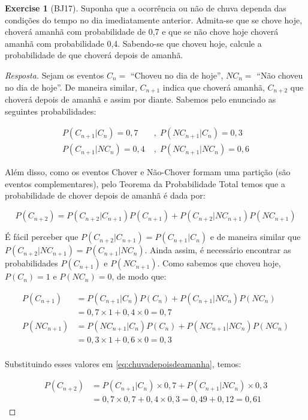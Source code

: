 \documentclass[
]{article}
\theoremstyle{definition}
\theoremstyle{definition}
\theoremstyle{definition}
\newtheorem{exercise}{Exercise}[section]
\theoremstyle{definition}
\theoremstyle{remark}
\begin{document}
\begin{exercise}[BJ17]

Suponha que a ocorrência ou não de chuva dependa das condições do tempo no dia imediatamente anterior. Admita-se que se chove hoje, choverá amanhã com probabilidade de 0,7 e que se não chove hoje choverá amanhã com probabilidade 0,4. Sabendo-se que choveu hoje, calcule a probabilidade de que choverá depois de amanhã.

\begin{proof}[Resposta]
Sejam os eventos \(C_{n} =\) ``Choveu no dia de hoje'', \(NC_{n} =\) ``Não choveu no dia de hoje''. De maneira similar, \(C_{n+1}\) indica que choverá amanhã, \(C_{n+2}\) que choverá depois de amanhã e assim por diante. Sabemos pelo enunciado as seguintes probabilidades:

\begin{align*}
P(C_{n+1}|C_{n}) = 0,7 \; &, \; P(NC_{n+1}|C_{n}) = 0,3 \\
P(C_{n+1}|NC_{n}) = 0,4 \; &, \; P(NC_{n+1}|NC_{n}) = 0,6
\end{align*}

Além disso, como os eventos Chover e Não-Chover formam uma partição (são eventos complementares), pelo Teorema da Probabilidade Total temos que a probabilidade de chover depois de amanhã é dada por:

\begin{equation}
P(C_{n+2}) = P(C_{n+2}|C_{n+1})P(C_{n+1}) + P(C_{n+2}|NC_{n+1})P(NC_{n+1})
\label{eq:chuvadepoisdeamanha}
\end{equation}

É fácil perceber que \(P(C_{n+2}|C_{n+1}) = P(C_{n+1}|C_{n})\) e de maneira similar que \(P(C_{n+2}|NC_{n+1}) = P(C_{n+1}|NC_{n})\). Ainda assim, é necessário encontrar as probabilidades \(P(C_{n+1})\) e \(P(NC_{n+1})\). Como sabemos que choveu hoje, \(P(C_{n}) = 1\) e \(P(NC_{n}) = 0\), de modo que:

\begin{align*}
P(C_{n+1}) &= P(C_{n+1}|C_{n})P(C_{n}) + P(C_{n+1}|NC_{n})P(NC_{n}) \\
&= 0,7 \times 1 + 0,4 \times 0 = 0,7 \\
P(NC_{n+1}) &= P(NC_{n+1}|C_{n})P(C_{n}) + P(NC_{n+1}|NC_{n})P(NC_{n}) \\
&= 0,3 \times 1 + 0,6 \times 0 = 0,3 \\
\end{align*}

Substituindo esses valores em \eqref{eq:chuvadepoisdeamanha}, temos:

\begin{align*}
P(C_{n+2}) &= P(C_{n+1}|C_{n}) \times 0,7 + P(C_{n+1}|NC_{n}) \times 0,3 \\
&= 0,7 \times 0,7 + 0,4 \times 0,3 = 0,49 + 0,12 = 0,61
\end{align*}
\end{proof}

\end{exercise}
\end{document}
